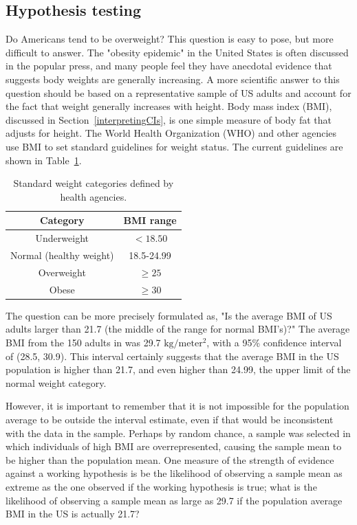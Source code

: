 \begin{spacing}{1.5}
\section[Hypothesis testing]{Hypothesis testing} %
\label{hypothesisTesting}


Do Americans tend to be overweight? This question is easy to pose, but more difficult to answer. The "obesity epidemic" in the United States is often discussed in the popular press, and many people feel they have anecdotal evidence that suggests body weights are generally increasing. A more scientific answer to this question should be based on a representative sample of US adults and account for the fact that weight generally increases with height. Body mass index (BMI), discussed in Section~\ref{interpretingCIs}, is one simple measure of body fat that adjusts for height. The World Health Organization (WHO) and other agencies use BMI to set standard guidelines for weight status. The current guidelines are shown in Table~\ref{whoBmiGuidelines}. 


\begin{table}[h!]
\begin{center}
\begin{tabular}{|c|c|}
\hline 
Category & BMI range\tabularnewline
\hline 
\hline 
Underweight & $<18.50$\tabularnewline
\hline 
Normal (healthy weight) & 18.5-24.99\tabularnewline
\hline 
Overweight & $\geq 25$\tabularnewline
\hline 
Obese & $\geq30$\tabularnewline
\hline
\end{tabular}
\caption{Standard weight categories defined by health agencies.} 
\label{whoBmiGuidelines}
\end{center}
\end{table}

The question can be more precisely formulated as, "Is the average BMI of US adults larger than 21.7 (the middle of the range for normal BMI's)?" The average BMI from the 150 adults in  was 29.7 $\text{kg}/\text{meter}{^2}$, with a 95\% confidence interval of (28.5, 30.9). This interval certainly suggests that the average BMI in the US population is higher than 21.7, and even higher than 24.99, the upper limit of the normal weight category. 

However, it is important to remember that it is not impossible for the population average to be outside the interval estimate, even if that would be inconsistent with the data in the sample. Perhaps by random chance, a sample was selected in which individuals of high BMI are overrepresented, causing the sample mean to be higher than the population mean. One measure of the strength of evidence against a working hypothesis is be the likelihood of observing a sample mean as extreme as the one observed if the working hypothesis is true; what is the likelihood of observing a sample mean as large as 29.7 if the population average BMI in the US is actually 21.7?


\end{spacing}
